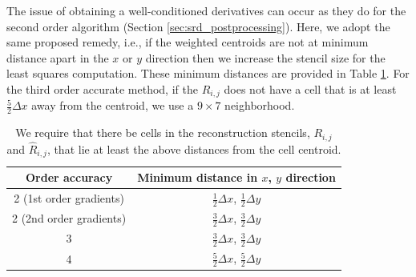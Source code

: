 The issue of obtaining a well-conditioned derivatives can occur as they do for the second order algorithm (Section \ref{sec:srd_postprocessing}).  Here, we adopt the same proposed remedy, i.e., if the weighted centroids are not at minimum distance apart in the $x$ or $y$ direction then we increase the stencil size for the least squares computation.  These minimum distances are provided in Table \ref{tab:mindist}.  For the third order accurate method, if the $ R_{i,j}$ does not have a cell that is at least $\frac{5}{2}\Delta x$ away from the centroid, we use a $9 \times 7$ neighborhood.
\begin{table}
	\centering
	\begin{tabular}{|c|c|}
		\hline 
		Order accuracy & Minimum distance in $x$, $y$ direction
                    \\[.08in] \hline 
		2 (1st order gradients)  & $\frac{1}{2}\Delta x$,
                    $\frac{1}{2}\Delta y$ \\[.08in] \hline 
		2 (2nd order gradients)  & $\frac{3}{2}\Delta x$, 
                     $\frac{3}{2}\Delta y$ \\ [.08in] \hline 
		3 & $\frac{3}{2}\Delta x$, $\frac{3}{2}\Delta y$ \\
                   [.08in] \hline
		4 & $\frac{5}{2}\Delta x$, $\frac{5}{2}\Delta y$ \\ [.08in] \hline 
	\end{tabular}  
	\caption{We require that there be cells in the reconstruction stencils, $R_{i,j}$ and $\widehat R_{i,j}$, that lie at least the above distances from the cell centroid.} \label{tab:mindist}
\end{table}

